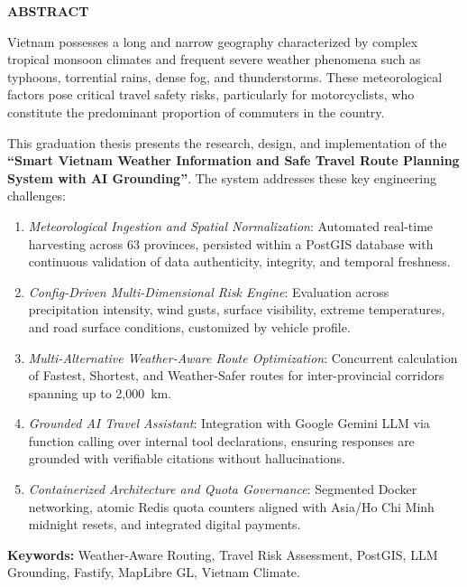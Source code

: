 \vspace{10mm}
\begin{center}
\textbf{\large ABSTRACT}
\end{center}

Vietnam possesses a long and narrow geography characterized by complex tropical monsoon climates and frequent severe weather phenomena such as typhoons, torrential rains, dense fog, and thunderstorms. These meteorological factors pose critical travel safety risks, particularly for motorcyclists, who constitute the predominant proportion of commuters in the country.

This graduation thesis presents the research, design, and implementation of the \textbf{“Smart Vietnam Weather Information and Safe Travel Route Planning System with AI Grounding”}. The system addresses these key engineering challenges:
\begin{enumerate}
    \item \textit{Meteorological Ingestion and Spatial Normalization}: Automated real-time harvesting across 63 provinces, persisted within a PostGIS database with continuous validation of data authenticity, integrity, and temporal freshness.
    \item \textit{Config-Driven Multi-Dimensional Risk Engine}: Evaluation across precipitation intensity, wind gusts, surface visibility, extreme temperatures, and road surface conditions, customized by vehicle profile.
    \item \textit{Multi-Alternative Weather-Aware Route Optimization}: Concurrent calculation of Fastest, Shortest, and Weather-Safer routes for inter-provincial corridors spanning up to 2,000~km.
    \item \textit{Grounded AI Travel Assistant}: Integration with Google Gemini LLM via function calling over internal tool declarations, ensuring responses are grounded with verifiable citations without hallucinations.
    \item \textit{Containerized Architecture and Quota Governance}: Segmented Docker networking, atomic Redis quota counters aligned with Asia/Ho Chi Minh midnight resets, and integrated digital payments.
\end{enumerate}

\textbf{Keywords:} Weather-Aware Routing, Travel Risk Assessment, PostGIS, LLM Grounding, Fastify, MapLibre GL, Vietnam Climate.
